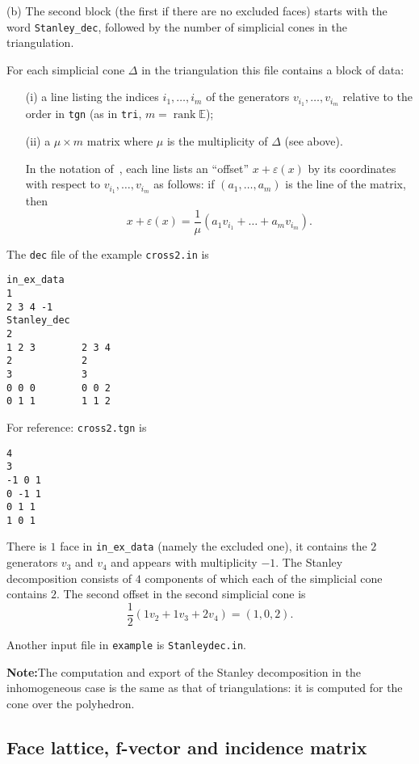\documentclass[12pt,a4paper]{scrartcl}
\newcounter{listi}
\theoremstyle{definition}
\def\EE{{\mathbb E}}
\DeclareMathOperator{\rank}{rank}
\let\epsilon=\varepsilon
\def\ttt{\texttt}
\begin{document}
(b) The second block (the first if there are no excluded faces) starts with
the word \verb|Stanley_dec|, followed by the number of simplicial cones in the
triangulation.

For each simplicial cone $\Delta$ in the
triangulation this file contains a block of data:
\begin{enumerate}
	\item[(i)] a line listing the indices $i_1,\dots,i_m$ of the
	generators $v_{i_1},\dots,v_{i_m}$ relative to the
	order in \ttt{tgn} (as in \ttt{tri}, $m=\rank \EE$);
	
	\item[(ii)] a $\mu\times m$ matrix where $\mu$ is the
	multiplicity of $\Delta$ (see above).
	
	In the notation of~\cite{BIS}, each line lists an
	``offset'' $x+\epsilon(x)$ by its coordinates with
	respect to $v_{i_1},\dots,v_{i_m}$ as follows: if
	$(a_1,\dots,a_m)$ is the line of the matrix, then
	$$
	x+\epsilon(x)=\frac{1}{\mu}(a_1v_{i_1}+\dots+a_mv_{i_m}).
	$$
\end{enumerate}


The \verb|dec| file of the example \verb|cross2.in| is
\begin{Verbatim}
in_ex_data
1
2 3 4 -1
Stanley_dec
2
1 2 3        2 3 4 
2            2
3            3
0 0 0        0 0 2 
0 1 1        1 1 2 
\end{Verbatim}
For reference: \verb|cross2.tgn| is
\begin{Verbatim}
4
3
-1 0 1 
0 -1 1 
0 1 1 
1 0 1 
\end{Verbatim}

There is $1$ face in \verb|in_ex_data| (namely the excluded one), it contains the $2$ generators $v_3$ and $v_4$ and appears with multiplicity $-1$. The Stanley decomposition consists of $4$ components of which each of the simplicial cone contains $2$. The second offset in the second simplicial cone is
$$
\frac12 (1v_2+1v_3+2v_4)=(1,0,2).
$$

Another input file in \verb|example| is \verb|Stanleydec.in|.

\textbf{Note:}\enspace The computation and export of the Stanley decomposition in the inhomogeneous case is the same as that of triangulations: it is computed for the cone over the polyhedron.

\subsection{Face lattice, f-vector and incidence matrix}\label{FaceLattice}
\end{document}
